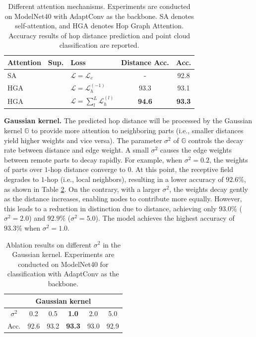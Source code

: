 \documentclass[letterpaper]{article}
\newcommand{\cmark}{\ding{51}}
\newcommand{\xmark}{\ding{55}}
\begin{document}
\setlength{\tabcolsep}{4pt}
\begin{table}
\begin{center}
\begin{tabular}{l c l c c}
\hline
Attention & Sup. & Loss & Distance Acc. & Acc.\\
\hline
SA & \cmark & $\mathcal{L} = \mathcal{L}_c $ & - & 92.8\\
HGA & \xmark & $\mathcal{L} = \mathcal{L}_h^{(-1)}$ & 93.3 & 93.1\\
HGA & \xmark & $\mathcal{L} = \sum_{l}^{L}\mathcal{L}_h^{(l)}$ & \bf{94.6} & \bf{93.3}\\
\hline
\end{tabular}
\end{center}
\caption{
Different attention mechanisms. Experiments are conducted on ModelNet40 with AdaptConv as the backbone.
SA denotes self-attention, and HGA denotes Hop Graph Attention.
Accuracy results of hop distance prediction and point cloud classification are reported.
}
\label{table:attention}
\end{table}


\textbf{Gaussian kernel.}
The predicted hop distance will be processed by the Gaussian kernel \(\mathbb{G}\) to provide more attention to neighboring parts (i.e., smaller distances yield higher weights and vice versa).
The parameter \(\sigma^2\) of \(\mathbb{G}\) controls the decay rate between distance and edge weight.
A small \(\sigma^2\) causes the edge weights between remote parts to decay rapidly.
For example, when \(\sigma^2=0.2\), the weights of parts over \(1\)-hop distance converge to $0$. At this point, the receptive field degrades to $1$-hop (i.e., local neighbors), resulting in a lower accuracy of $92.6\%$, as shown in Table \ref{table:ablation}.
On the contrary, with a larger $\sigma^2$, the weights decay gently as the distance increases, enabling nodes to contribute more equally.
However, this leads to a reduction in distinction due to distance, achieving only $93.0\%$ ($\sigma^2=2.0$) and $92.9\%$ ($\sigma^2=5.0$).
The model achieves the highest accuracy of $93.3\%$ when $\sigma^2=1.0$.


\begin{table}
\begin{center}
\begin{tabular}{c| c c c c c}
\hline
\multicolumn{6}{c}{Gaussian kernel}\\
\hline
$\sigma^2$ & 0.2 & 0.5 & \textbf{1.0} & 2.0 & 5.0\\
Acc. & 92.6 & 93.2 & \textbf{93.3} & 93.0 & 92.9 \\
\hline
\end{tabular}
\end{center}
\caption{Ablation results on different \(\sigma^2\) in the Gaussian kernel. Experiments are conducted on ModelNet40 for classification with AdaptConv as the backbone.}
\label{table:ablation}
\end{table}
\end{document}

